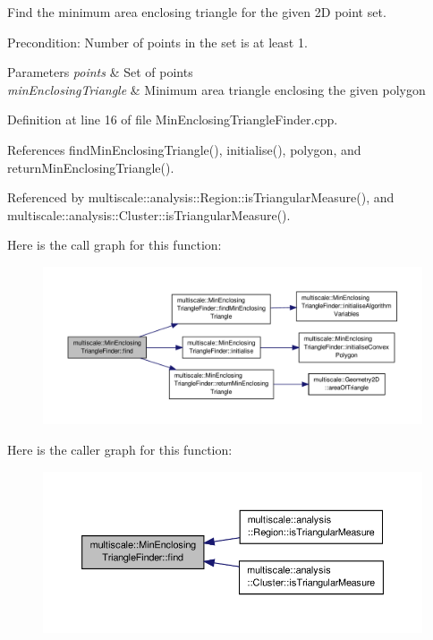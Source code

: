 Find the minimum area enclosing triangle for the given 2\-D point set. 

Precondition\-: Number of points in the set is at least 1.


\begin{DoxyParams}{Parameters}
{\em points} & Set of points \\
\hline
{\em min\-Enclosing\-Triangle} & Minimum area triangle enclosing the given polygon \\
\hline
\end{DoxyParams}


Definition at line 16 of file Min\-Enclosing\-Triangle\-Finder.\-cpp.



References find\-Min\-Enclosing\-Triangle(), initialise(), polygon, and return\-Min\-Enclosing\-Triangle().



Referenced by multiscale\-::analysis\-::\-Region\-::is\-Triangular\-Measure(), and multiscale\-::analysis\-::\-Cluster\-::is\-Triangular\-Measure().



Here is the call graph for this function\-:\nopagebreak
\begin{figure}[H]
\begin{center}
\leavevmode
\includegraphics[width=350pt]{classmultiscale_1_1MinEnclosingTriangleFinder_afe74965c39261feb7152f5556c0281cd_cgraph}
\end{center}
\end{figure}




Here is the caller graph for this function\-:\nopagebreak
\begin{figure}[H]
\begin{center}
\leavevmode
\includegraphics[width=350pt]{classmultiscale_1_1MinEnclosingTriangleFinder_afe74965c39261feb7152f5556c0281cd_icgraph}
\end{center}
\end{figure}


